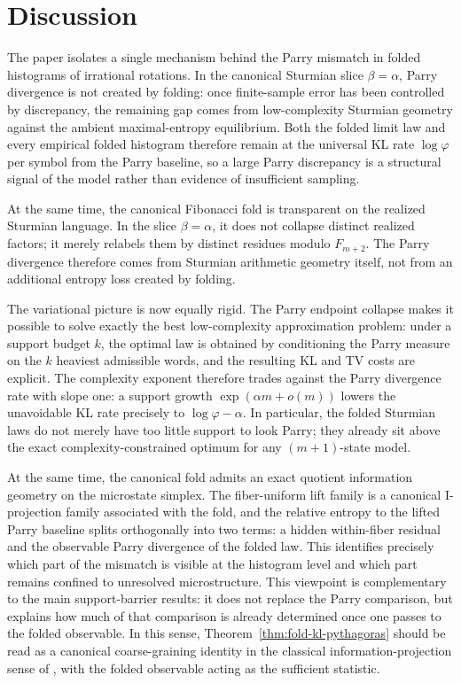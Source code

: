 \documentclass[11pt,letterpaper]{article}
\numberwithin{equation}{section}
\theoremstyle{plain}
\theoremstyle{definition}
\theoremstyle{remark}
\begin{document}
\section{Discussion}

The paper isolates a single mechanism behind the Parry mismatch in folded
histograms of irrational rotations. In the canonical Sturmian slice
\(\beta=\alpha\), Parry divergence is not created by folding: once
finite-sample error has been controlled by discrepancy, the remaining gap comes
from low-complexity Sturmian geometry against the ambient maximal-entropy
equilibrium. Both the folded limit law and every empirical folded histogram
therefore remain at the universal KL rate \(\log\varphi\) per symbol from the
Parry baseline, so a large Parry discrepancy is a structural signal of the
model rather than evidence of insufficient sampling.

At the same time, the canonical Fibonacci fold is transparent on the realized
Sturmian language. In the slice \(\beta=\alpha\), it does not collapse distinct
realized factors; it merely relabels them by distinct residues modulo
\(F_{m+2}\). The Parry divergence therefore comes from Sturmian arithmetic
geometry itself, not from an additional entropy loss created by folding.

The variational picture is now equally rigid. The Parry endpoint collapse makes
it possible to solve exactly the best low-complexity approximation problem:
under a support budget \(k\), the optimal law is obtained by conditioning the
Parry measure on the \(k\) heaviest admissible words, and the resulting KL and
TV costs are explicit. The complexity exponent therefore trades against the
Parry divergence rate with slope one: a support growth
\(\exp(\alpha m+o(m))\) lowers the unavoidable KL rate precisely to
\(\log\varphi-\alpha\). In particular, the folded Sturmian laws do not merely
have too little support to look Parry; they already sit above the exact
complexity-constrained optimum for any \((m+1)\)-state model.

At the same time, the canonical fold admits an exact quotient information
geometry on the microstate simplex. The fiber-uniform lift family is a canonical
I-projection family associated with the fold, and the relative entropy to the lifted Parry baseline
splits orthogonally into two terms: a hidden within-fiber residual and the
observable Parry divergence of the folded law. This identifies precisely which
part of the mismatch is visible at the histogram level and which part remains
confined to unresolved microstructure. This viewpoint is complementary to the
main support-barrier results: it does not replace the Parry comparison, but
explains how much of that comparison is already determined once one passes to
the folded observable. In this sense, Theorem~\ref{thm:fold-kl-pythagoras}
should be read as a canonical coarse-graining identity in the classical
information-projection sense of \cite{Csiszar1975IdivergenceGeometry}, with the
folded observable acting as the sufficient statistic.
\end{document}
